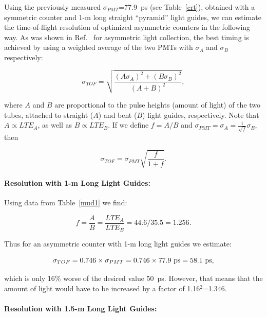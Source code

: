 Using the previously measured $\sigma_{PMT}$=77.9~ps (see Table~\ref{crt}), 
obtained with a symmetric counter and 1-m long straight ``pyramid'' light 
guides, we can estimate the time-of-flight resolution of optimized 
asymmetric counters in the following way.  As was shown in Ref.~\cite{r4} 
for asymmetric light collection, the best timing is achieved by using a 
weighted average of the two PMTs with $\sigma_A$ and $\sigma_B$ respectively:

\begin{equation}
\label{eq0}
\sigma_{TOF}=\sqrt{\frac{(A\sigma_A)^2+(B\sigma_B)^2}{(A+B)^2}},
\end{equation}

\noindent
where $A$ and $B$ are proportional to the pulse heights (amount of light) 
of the two tubes, attached to straight ($A$) and bent ($B$) light guides, 
respectively.  Note that $A \propto LTE_A$, as well as  $B \propto LTE_B$.
If we define $f = A/B$ and $\sigma_{PMT}=\sigma_A= \frac{1}{\sqrt{f}}\sigma_B$,
then

\begin{equation}
\label{eq1}
\sigma_{TOF}=\sigma_{PMT}\sqrt{\frac{f}{1+f}}.
\end{equation}

\paragraph{Resolution with 1-m Long Light Guides:}

Using data from Table~\ref{mud1} we find:  

\begin{equation}
\label{eq2}
f = \frac{A}{B}=\frac{LTE_A}{LTE_B}=44.6/35.5=1.256.
\end{equation}

\noindent
Thus for an asymmetric counter with 1-m long light guides we estimate:

\begin{equation}
\label{eq3}
\sigma_{TOF} = 0.746\times\sigma_{PMT} = 0.746\times77.9~{\rm ps} =
58.1~{\rm ps},
\end{equation} 

\noindent
which is only 16\% worse of the desired value 50~ps. However, that means 
that the amount of light would have to be increased by a factor of
1.16$^2$=1.346.

\paragraph{Resolution with 1.5-m Long Light Guides:}

